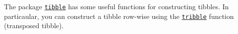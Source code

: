 \documentclass[]{book}
\theoremstyle{definition}
\theoremstyle{definition}
\theoremstyle{definition}
\theoremstyle{remark}
\begin{document}
The package \href{http://tibble.tidyverse.org/}{\texttt{tibble}} has
some useful functions for constructing tibbles. In particaular, you can
construct a tibble row-wise using the
\href{http://tibble.tidyverse.org/reference/tribble.html}{\texttt{tribble}}
function (transposed tibble).


\end{document}

